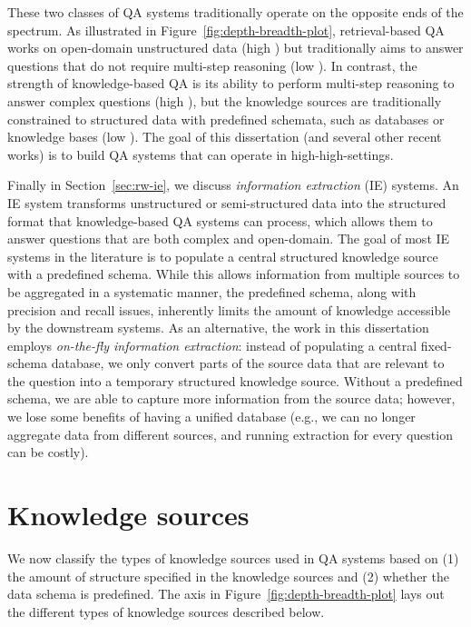 These two classes of QA systems
traditionally operate on the opposite ends
of the spectrum.
As illustrated in Figure~\ref{fig:depth-breadth-plot},
retrieval-based QA works on open-domain unstructured data
(high \Breadth)
but traditionally aims to answer questions
that do not require multi-step reasoning
(low \Depth).
In contrast,
the strength of knowledge-based QA is its ability to
perform multi-step reasoning to answer complex questions
(high \Depth),
but the knowledge sources are traditionally constrained
to structured data with predefined schemata,
such as databases or knowledge bases
(low \Breadth).
The goal of this dissertation
(and several other recent works)
is to build QA systems that can
operate in high-\Breadth high-\Depth settings.

Finally in Section~\ref{sec:rw-ie},
we discuss \emph{information extraction} (IE) systems.
An IE system transforms unstructured or semi-structured data
into the structured format that knowledge-based QA systems can process,
which allows them to answer questions that are both complex
and open-domain.
The goal of most IE systems in the literature is to populate
a central structured knowledge source with a predefined schema.
While this allows information from multiple sources to be aggregated
in a systematic manner,
the predefined schema,
along with precision and recall issues,
inherently limits the amount of knowledge accessible by
the downstream systems.
As an alternative, the work in this dissertation employs
\emph{on-the-fly information extraction}:
instead of populating a central fixed-schema database,
we only convert parts of the source data
that are relevant to the question
into a temporary structured knowledge source.
Without a predefined schema, we are able to capture
more information from the source data;
however, we lose some benefits of having a unified database
(e.g., we can no longer aggregate data from different sources,
and running extraction for every question can be costly).

\section{Knowledge sources}
\label{sec:rw-knowledge-sources}

We now classify the types of knowledge sources used
in QA systems based on
(1) the amount of structure specified
in the knowledge sources and
(2) whether the data schema is predefined.
The \Breadth axis in
Figure~\ref{fig:depth-breadth-plot}
lays out the different types of knowledge sources
described below.


